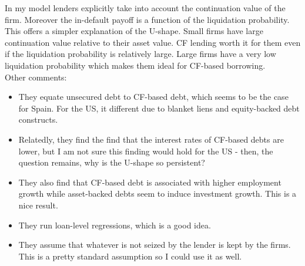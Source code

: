 \documentclass[12pt]{article}
\begin{document}
In my model lenders explicitly take into account the continuation value of the firm. Moreover the in-default payoff is a function of the liquidation probability. This offers a simpler explanation of the U-shape. Small firms have large continuation value relative to their asset value. CF lending worth it for them even if the liquidation probability is relatively large. Large firms have a very low liquidation probability which makes them ideal for CF-based borrowing. \vspace{3mm} \\
Other comments:
\begin{itemize} \setlength\itemsep{0em} \small
    \item They equate unsecured debt to CF-based debt, which seems to be the case for Spain. For the US, it different due to blanket liens and equity-backed debt constructs.
    \item Relatedly, they find the find that the interest rates of CF-based debts are lower, but I am not sure this finding would hold for the US - then, the question remains, why is the U-shape so persistent? 
    \item They also find that CF-based debt is associated with higher employment growth while asset-backed debts seem to induce investment growth. This is a nice result. 
    \item They run loan-level regressions, which is a good idea. 
    \item They assume that whatever is not seized by the lender is kept by the firms. This is a pretty standard assumption so I could use it as well. 
\end{itemize}  \normalsize
\end{document}
